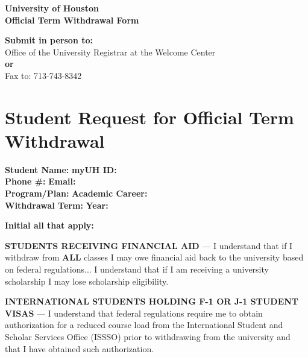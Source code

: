 \documentclass[12pt]{article}
\begin{document}
\sloppy

\begin{center}
    \textbf{\Large University of Houston\\ Official Term Withdrawal Form}
\end{center}

\vspace{1em}

\noindent\textbf{Submit in person to:} \\
Office of the University Registrar at the Welcome Center \\
\textbf{or} \\
Fax to: 713-743-8342

\vspace{1.5em}

\section*{Student Request for Official Term Withdrawal}

\begin{flushleft}
\textbf{Student Name:} \hfill \textbf{myUH ID:}  \\
\textbf{Phone \#:} \hfill \textbf{Email:} \\
\textbf{Program/Plan:} \hfill \textbf{Academic Career:}\\
\textbf{Withdrawal Term:} \hfill \textbf{Year:}\\
\end{flushleft}

\vspace{1em}

\noindent\textbf{Initial all that apply:}

\noindent\underline{\hspace{1.5em}} \textbf{STUDENTS RECEIVING FINANCIAL AID} — I understand that if I withdraw from \textbf{ALL} classes I may owe financial aid back to the university based on federal regulations... I understand that if I am receiving a university scholarship I may lose scholarship eligibility.
\vspace{1em}

\noindent\underline{\hspace{1.5em}} \textbf{INTERNATIONAL STUDENTS HOLDING F-1 OR J-1 STUDENT VISAS} — I understand that federal regulations require me to obtain authorization for a reduced course load from the International Student and Scholar Services Office (ISSSO) prior to withdrawing from the university and that I have obtained such authorization.
\vspace{1em}
\end{document}
